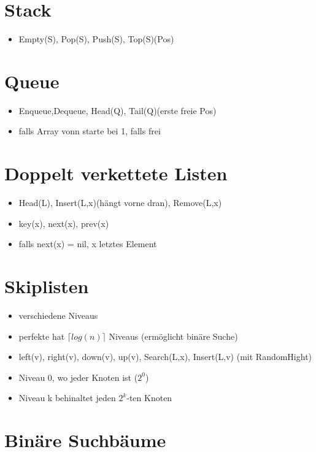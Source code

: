\documentclass{article}
\begin{document}
\section{Stack}
\begin{itemize}
\item Empty(S), Pop(S), Push(S), Top(S)(Pos)
\end{itemize}

\section{Queue}
\begin{itemize}
\item Enqueue,Dequeue, Head(Q), Tail(Q)(erste freie Pos)
\item falls Array vonn starte bei 1, falls frei
\end{itemize}

\section{Doppelt verkettete Listen}
\begin{itemize}
\item Head(L), Insert(L,x)(hängt vorne dran), Remove(L,x)
\item key(x), next(x), prev(x)
\item falls next(x) = nil, x letztes Element
\end{itemize}

\section{Skiplisten}
\begin{itemize}
\item verschiedene Niveaus 
\item perfekte hat $ \lceil  log(n)\rceil$ Niveaus (ermöglicht binäre Suche)
\item left(v), right(v), down(v), up(v), Search(L,x), Insert(L,v) (mit RandomHight)
\item Niveau 0, wo jeder Knoten ist ($2^0$)
\item Niveau k behinaltet jeden $2^k$-ten Knoten
\end{itemize}

\section{Binäre Suchbäume}
\end{document}
